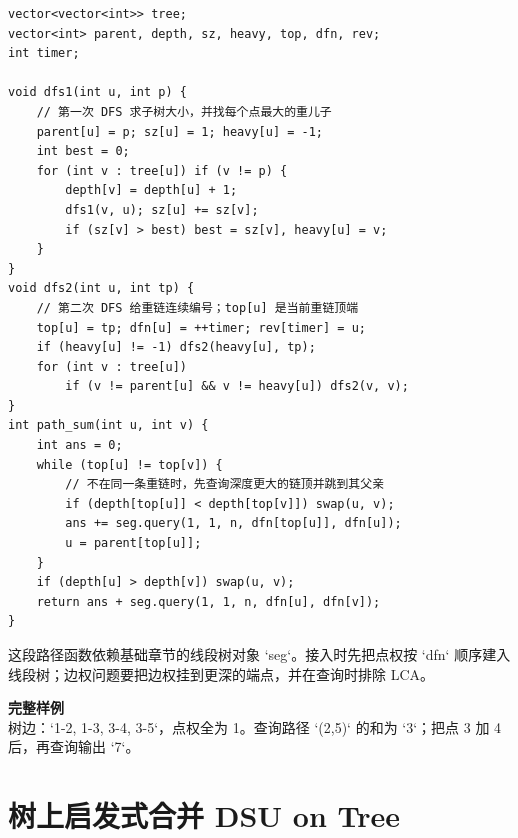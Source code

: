 \begin{lstlisting}[style=cpp]
vector<vector<int>> tree;
vector<int> parent, depth, sz, heavy, top, dfn, rev;
int timer;

void dfs1(int u, int p) {
    // 第一次 DFS 求子树大小，并找每个点最大的重儿子
    parent[u] = p; sz[u] = 1; heavy[u] = -1;
    int best = 0;
    for (int v : tree[u]) if (v != p) {
        depth[v] = depth[u] + 1;
        dfs1(v, u); sz[u] += sz[v];
        if (sz[v] > best) best = sz[v], heavy[u] = v;
    }
}
void dfs2(int u, int tp) {
    // 第二次 DFS 给重链连续编号；top[u] 是当前重链顶端
    top[u] = tp; dfn[u] = ++timer; rev[timer] = u;
    if (heavy[u] != -1) dfs2(heavy[u], tp);
    for (int v : tree[u])
        if (v != parent[u] && v != heavy[u]) dfs2(v, v);
}
int path_sum(int u, int v) {
    int ans = 0;
    while (top[u] != top[v]) {
        // 不在同一条重链时，先查询深度更大的链顶并跳到其父亲
        if (depth[top[u]] < depth[top[v]]) swap(u, v);
        ans += seg.query(1, 1, n, dfn[top[u]], dfn[u]);
        u = parent[top[u]];
    }
    if (depth[u] > depth[v]) swap(u, v);
    return ans + seg.query(1, 1, n, dfn[u], dfn[v]);
}
\end{lstlisting}

\begin{warnbox}
这段路径函数依赖基础章节的线段树对象 `seg`。接入时先把点权按 `dfn` 顺序建入线段树；边权问题要把边权挂到更深的端点，并在查询时排除 LCA。
\end{warnbox}

\begin{card}
\textbf{完整样例}\\
树边：`1-2, 1-3, 3-4, 3-5`，点权全为 1。查询路径 `(2,5)` 的和为 `3`；把点 3 加 4 后，再查询输出 `7`。
\end{card}

\section{树上启发式合并 DSU on Tree}


